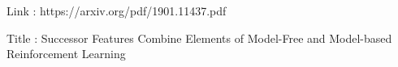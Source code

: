 \documentclass{article}
\begin{document}
Link : https://arxiv.org/pdf/1901.11437.pdf

Title : Successor Features Combine Elements of Model-Free and
Model-based Reinforcement Learning
\end{document}
